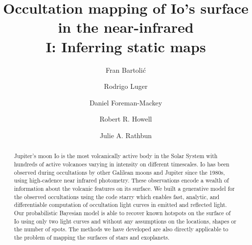 \documentclass[linenumbers,modern]{aastex62}
\begin{document}
\title{
    \vspace{-3em}
\textbf{Occultation mapping of Io's surface in the near-infrared \\ I: Inferring static maps} 
}
\author[0000-0001-8630-9794]{Fran Bartoli\'c}
\author[0000-0002-0296-3826]{Rodrigo Luger}
\author[0000-0002-9328-5652]{Daniel Foreman-Mackey}
\author[0000-0003-4859-2060]{Robert R. Howell}
\author[0000-0001-7619-652X]{Julie A. Rathbun}
%

\begin{abstract}
Jupiter's moon Io is the most volcanically active body in the Solar System with hundreds of active volcanoes varying in intensity on different timescales.
Io has been observed during occultations by other Galilean moons and Jupiter since the 1980s, using high-cadence near infrared photometry. 
These observations encode a wealth of information about the volcanic features on its surface.
    We built a generative model for the observed occultations using the code \textsf{starry} which enables fast, analytic, and differentiable computation of occultation light curves in emitted and reflected light.
    Our probabilistic Bayesian model is able to recover known hotspots on the surface of Io using only two light curves and without any assumptions on the locations, shapes or the number of spots.
    The methods we have developed are also directly applicable to the problem of mapping the surfaces of stars and exoplanets. \href{https://github.com/fbartolic/volcano}{\color{linkcolor}\faGithub}
\end{abstract}

%
\end{document}
